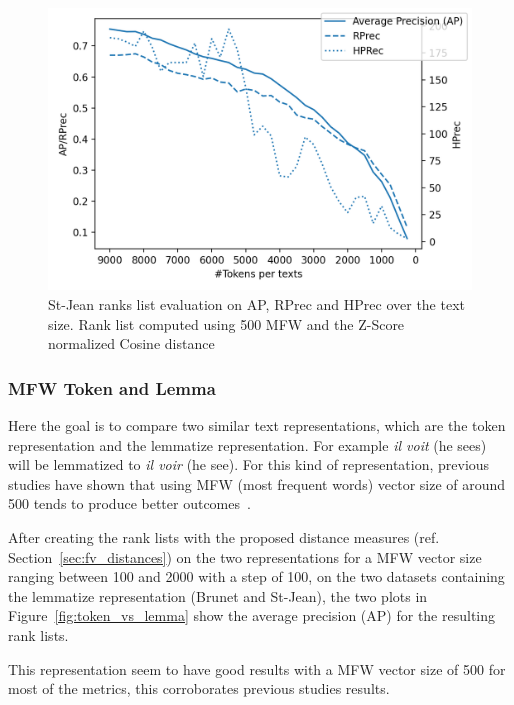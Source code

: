 \begin{figure}
  \centering
  \includegraphics[width=\linewidth]{img/degradation.png}
  \caption{St-Jean ranks list evaluation on AP, RPrec and HPrec over the text size.
  Rank list computed using 500 MFW and the Z-Score normalized Cosine distance}
  \label{img:degradation}
\end{figure}

\subsubsection{MFW Token and Lemma}
\label{sec:mfw_token_lemma}

Here the goal is to compare two similar text representations, which are the token representation and the lemmatize representation.
For example \textit{il voit} (he sees) will be lemmatized to \textit{il voir} (he see).
For this kind of representation, previous studies have shown that using MFW (most frequent words) vector size of around 500 tends to produce better outcomes~\cite{savoy_text_representation}.

After creating the rank lists with the proposed distance measures (ref. Section~\ref{sec:fv_distances}) on the two representations for a MFW vector size ranging between 100 and 2000 with a step of 100, on the two datasets containing the lemmatize representation (Brunet and St-Jean), the two plots in Figure~\ref{fig:token_vs_lemma} show the average precision (AP) for the resulting rank lists.

This representation seem to have good results with a MFW vector size of 500 for most of the metrics, this corroborates previous studies results.

